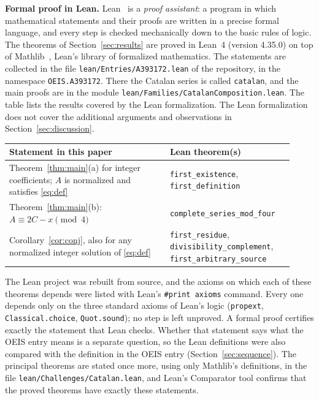\documentclass[11pt,a4paper]{article}
\theoremstyle{definition}
\theoremstyle{remark}
\newcommand{\para}[1]{\par\medskip\noindent\textbf{#1}\enspace}
\begin{document}
\para{Formal proof in Lean.}
Lean~\cite{lean} is a \emph{proof assistant}: a program in which mathematical statements and their proofs are written
in a precise formal language, and every step is checked mechanically down to the basic rules of logic. The theorems of Section~\ref{sec:results} are proved in Lean~4 (version 4.35.0) on top of
Mathlib~\cite{mathlib}, Lean's library of formalized mathematics. The statements are collected in the file \texttt{lean/Entries/A393172.lean} of the repository,
in the namespace \texttt{OEIS.A393172}. There the Catalan series is called \texttt{catalan}, and the main proofs are in the module \texttt{lean/Families/CatalanComposition.lean}.
The table lists the results covered by the Lean formalization. The Lean formalization does not cover the additional arguments and observations in Section~\ref{sec:discussion}.
\begin{center}\small\renewcommand{\arraystretch}{1.25}
\begin{tabular}{>{\raggedright\arraybackslash}p{0.52\linewidth}>{\raggedright\arraybackslash}p{0.4\linewidth}}
\toprule
Statement in this paper & Lean theorem(s)\\
\midrule
Theorem~\ref{thm:main}(a) for integer coefficients; $A$ is normalized and satisfies \eqref{eq:def} & \texttt{first\_\allowbreak{}existence}, \texttt{first\_\allowbreak{}definition} \\
Theorem~\ref{thm:main}(b): $A\equiv2C-x\pmod4$ & \texttt{complete\_\allowbreak{}series\_\allowbreak{}mod\_\allowbreak{}four} \\
Corollary~\ref{cor:conj}, also for any normalized integer solution of \eqref{eq:def} & \texttt{first\_\allowbreak{}residue}, \texttt{divisibility\_\allowbreak{}complement}, \texttt{first\_\allowbreak{}arbitrary\_\allowbreak{}source} \\
\bottomrule
\end{tabular}
\end{center}
The Lean project was rebuilt from source, and the axioms on which each of these theorems depends were listed with
Lean's \texttt{\#print axioms} command. Every one depends only on the three standard axioms of Lean's logic
(\texttt{propext}, \texttt{Classical.choice}, \texttt{Quot.sound}); no step is left unproved. A formal proof certifies
exactly the statement that Lean checks. Whether that statement says what the OEIS entry means is a separate question,
so the Lean definitions were also compared with the definition in the OEIS entry
(Section~\ref{sec:sequence}). The principal theorems are stated once more, using only Mathlib's definitions, in the
file \texttt{lean/Challenges/Catalan.lean}, and Lean's Comparator tool confirms that the
proved theorems have exactly these statements.
\end{document}
